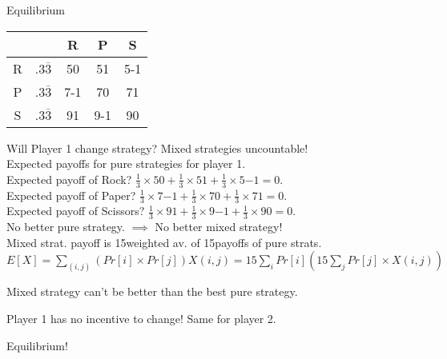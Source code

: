 \begin{frame}{Equilibrium}

{\tiny
\def \thrdone {{{\color{blue} \tiny $.3\overline{3}$}}}
\def \thrdtwo {{{\color{blue} \tiny $.3\overline{3}$}}}

\begin{tabular}{c | c| c| c| c|}
\multicolumn{1}{c}{} &  & \multicolumn{1}{c}{R} & \multicolumn{1}{c}{P} & \multicolumn{1}{c}{S} \\ \cline{3-5}
\hline 
R & \thrdone & {5}{0} & {5}{1} & {5}{-1} \\
P & \thrdone & {7}{-1} & {7}{0} & {7}{1} \\
S & \thrdone & {9}{1} & {9}{-1} & {9}{0} \\
\end{tabular}
}

Will Player 1 change strategy? 
Mixed strategies uncountable! \\ 
Expected payoffs for pure strategies for player 1. \\
{\small
Expected payoff of Rock?  $\frac{1}{3} \times {5}{0} + \frac{1}{3} \times {5}{1} + \frac{1}{3} \times {5}{-1} = 0$. \\  %
Expected payoff of Paper?  $\frac{1}{3} \times {7}{-1} + \frac{1}{3} \times {7}{0} + \frac{1}{3} \times {7}{1} = 0$. \\   %
Expected payoff of Scissors?  $\frac{1}{3} \times {9}{1} + \frac{1}{3} \times {9}{-1} + \frac{1}{3} \times {9}{0} = 0$. \\  
}
No better pure strategy.   $\implies$  No better mixed strategy! \\  
Mixed strat. payoff is {15}{weighted av.} of {15}{payoffs of pure strats.} \\
{\small
$E[X]  = \sum_{(i,j)} (Pr[i]\times Pr[j]) X(i,j) 
 = {15}{\sum_i Pr[i]} ({15}{\sum_j Pr[j] \times X(i,j)})$  %
}

Mixed strategy can't be better than the best pure strategy.

Player 1 has no incentive to change!  Same for player 2.

{\color{blue} Equilibrium!}
\end{frame}



